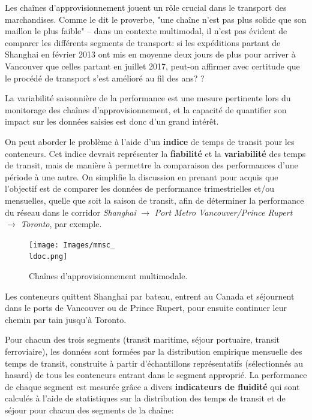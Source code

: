 \begin{Exemple} Les chaînes d'ap\-pro\-vi\-sion\-ne\-ment jouent un rôle crucial dans le transport des marchandises. Comme le  dit le proverbe, "une chaîne n'est pas plus solide que son maillon le plus faible" -- dans un contexte multimodal, il n'est pas \'evident de comparer les différents segments de transport: si les expéditions partant de Shanghai en février 2013 ont mis en moyenne deux jours de plus pour arriver à Vancouver que celles partant en juillet 2017, peut-on affirmer avec certitude que le proc\'ed\'e de transport s'est amélioré au fil des ans? ? \par La variabilité saisonnière de la performance est une mesure pertinente lors du monitorage des chaînes d'ap\-pro\-vi\-sion\-ne\-ment, et la capacité de quantifier son impact sur les données saisies est donc d'un grand intérêt. \par 
On peut aborder le probl\`eme \`a l'aide d'un \textbf{indice} de temps de transit pour les conteneurs. Cet indice devrait représenter la \textbf{fiabilit\'e} et la \textbf{variabilit\'e} des temps de transit, mais de manière à permettre la comparaison des performances d'une p\'eriode \`a une autre.
\newl On simplifie la discussion en prenant pour acquis que l'ob\-jec\-tif est de comparer les données de performance trimestrielles et/ou mensuelles, quelle que soit la saison de transit, afin de déterminer la performance du réseau dans le corridor \textit{Shanghai} $\to$ \textit{Port Metro Vancouver/Prince Rupert} $\to$ \textit{Toronto}, par exemple. 
\begin{figure}[H]
\centering
\texttt{[image: Images/mmsc\_\\ldoc.png]}
\caption{\small Chaînes d'ap\-pro\-vi\-sion\-ne\-ment multimodale.} \label{fig:mmsc}
\end{figure}
\noindent Les conteneurs quittent Shanghai par bateau, entrent au Canada et s\'ejournent dans le ports de Vancouver ou de Prince Rupert, pour ensuite continuer leur chemin par tain jusqu'\`a Toronto. \par 
Pour chacun des trois segments (transit maritime, s\'ejour portuaire, transit ferroviaire), les données sont form\'ees par la distribution empirique mensuelle des temps de transit, construite à partir d'échantillons repr\'esentatifs (sélectionnés au hasard) de tous les conteneurs entrant dans le segment approprié.
\newl
La performance de chaque segment est mesurée gr\^ace a divers \textbf{indicateurs de fluidit\'e} qui sont calculés à l'aide de  statistiques sur la distribution des temps de transit et de séjour pour chacun des segments de la chaîne: 

\end{Exemple}

